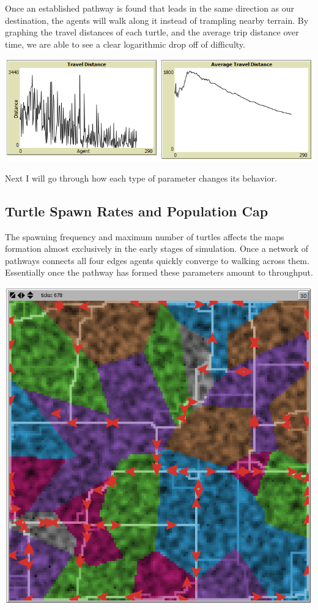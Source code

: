 \documentclass[conference]{IEEEtran}
\begin{document}
Once an established pathway is found that leads in the same direction as our destination, the agents will walk along it instead of trampling nearby terrain. By graphing the travel distances of each turtle, and the average trip distance over time, we are able to see a clear logarithmic drop off of difficulty.

\includegraphics[scale=0.25]{image/results3}

Next I will go through how each type of parameter changes its behavior. 

\subsection{Turtle Spawn Rates and Population Cap}
The spawning frequency and maximum number of turtles affects the maps formation almost exclusively in the early stages of simulation. Once a network of pathways connects all four edges agents quickly converge to walking across them. Essentially once the pathway has formed these parameters amount to throughput. 

\includegraphics[scale=0.25]{image/results4}
	
\end{document}
